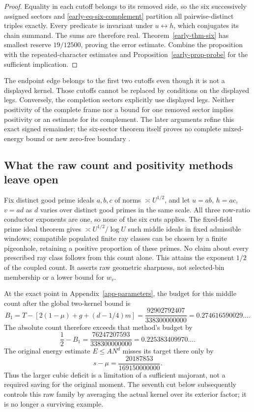 \documentclass[11pt]{article}
\theoremstyle{definition}
\begin{document}
\begin{proof}
Equality in each cutoff belongs to its removed side, so the six
successively assigned sectors and
\eqref{early-eq-six-complement} partition all pairwise-distinct
triples exactly.  Every predicate is invariant under
\(u\leftrightarrow h\), which conjugates its chain summand.
The sums are therefore real.  Theorem~\ref{early-thm-six} has
smallest reserve \(19/12500\), proving the error estimate.
Combine the proposition with the repeated-character estimates and
Proposition~\ref{early-prop-probe} for the sufficient implication.
\end{proof}

The endpoint edge belongs to the first two cutoffs even though it is
not a displayed kernel.  Those cutoffs cannot be replaced by conditions
on the displayed legs.  Conversely, the completion sectors explicitly
use displayed legs.  Neither positivity of the complete frame nor a
bound for one removed sector implies positivity or an estimate for its
complement.  The later arguments refine this exact signed remainder;
the six-sector theorem itself proves no complete mixed-energy bound
or new zero-free boundary \cite{n4,n5}.

\subsection{What the raw count and positivity methods leave open}
\label{sec-raw-barriers}
Fix distinct good prime ideals $a,b,c$ of norms $\asymp U^{1/2}$, and let $u=ab$, $h=ac$, $v=ad$ as $d$ varies over distinct good primes in the same scale. All three row-ratio conductor exponents are one, so none of the six cuts applies. The fixed-field prime ideal theorem gives $\asymp U^{1/2}/\log U$ such middle ideals in fixed admissible windows; compatible populated finite ray classes can be chosen by a finite pigeonhole, retaining a positive proportion of these primes. No claim about every prescribed ray class follows from this count alone. This attains the exponent $1/2$ of the coupled count. It asserts raw geometric sharpness, not selected-bin membership or a lower bound for $w_v$.

At the exact point in Appendix~\ref{app-parameters}, the budget for this middle count after the global two-kernel bound is
\[
 B_1=T-[2(1-\mu)+g+(d-1/4)m]
 =\frac{92902792407}{338300000000}
 =0.274616590029\ldots.
\]
The absolute count therefore exceeds that method's budget by
\[
 \frac12-B_1=\frac{76247207593}{338300000000}
 =0.225383409970\ldots.
\]
The original energy estimate $E\le AN^d$ misses its target there only by
\[s-\mu=\frac{20187853}{169150000000}.\] Thus the larger cubic deficit is a limitation of a sufficient majorant, not a required saving for the original moment. The seventh cut below subsequently controls this raw family by averaging the actual kernel over its exterior factor; it is no longer a surviving example.
\end{document}

